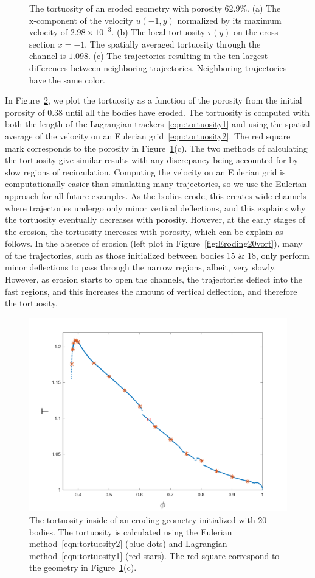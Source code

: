 \documentclass[preprint, 10pt]{elsarticle}
\begin{document}
\begin{figure}[H]
\begin{subfigure}[b]{0.5\textwidth}
\caption{}
\end{subfigure}
\caption{\label{fig:Eroding20tort} The tortuosity of an eroded geometry
with porosity 62.9\%. (a) The x-component of the velocity $u(-1, y)$
normalized by its maximum velocity of $2.98 \times 10^{-3}$. (b) The
local tortuosity $\tau(y)$ on the cross section $x = -1$.  The spatially
averaged tortuosity through the channel is $1.098$.  (c) The
trajectories resulting in the ten largest differences between
neighboring trajectories.  Neighboring trajectories have the same
color.}
\end{figure}

In Figure~\ref{fig:Eroding20tort_all}, we plot the tortuosity as a
function of the porosity from the initial porosity of $0.38$ until all
the bodies have eroded.  The tortuosity is computed with both the
length of the Lagrangian trackers~\eqref{eqn:tortuosity1} and using the
spatial average of the velocity on an Eulerian
grid~\eqref{eqn:tortuosity2}.  The red square mark corresponds to the
porosity in Figure~\ref{fig:Eroding20tort}(c).  The two methods of
calculating the tortuosity give similar results with any discrepancy
being accounted for by slow regions of recirculation.  Computing the
velocity on an Eulerian grid is computationally easier than simulating
many trajectories, so we use the Eulerian approach for all future
examples.  As the bodies erode, this creates wide channels where
trajectories undergo only minor vertical deflections, and this explains
why the tortuosity eventually decreases with porosity.  However, at the
early stages of the erosion, the tortuosity increases with porosity,
which can be explain as follows.   In the absence of erosion
(left plot in Figure~\ref{fig:Eroding20vort}), many of the trajectories,
such as those initialized between bodies 15 \& 18, only perform minor
deflections to pass through the narrow regions, albeit, very slowly.
However, as erosion starts to open the channels, the trajectories
deflect into the fast regions, and this increases the amount of vertical
deflection, and therefore the tortuosity.


\begin{figure}[H]
\center
\includegraphics*[width =0.5\linewidth]{./figs/tort_eulerian}
\caption{\label{fig:Eroding20tort_all} The tortuosity inside of an
eroding geometry initialized with 20 bodies.  The tortuosity is
calculated using the Eulerian method~\eqref{eqn:tortuosity2} (blue dots)
and Lagrangian method~\eqref{eqn:tortuosity1} (red stars).  The red
square correspond to the geometry in Figure~\ref{fig:Eroding20tort}(c).}
\end{figure}
\end{document}
